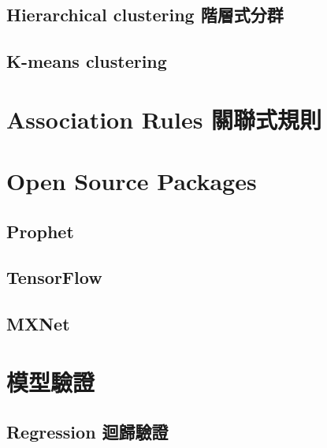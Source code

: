 \documentclass[
]{book}
\begin{document}
\hypertarget{hierarchical-clustering-ux968eux5c64ux5f0fux5206ux7fa4}{%
\subsection{Hierarchical clustering 階層式分群}\label{hierarchical-clustering-ux968eux5c64ux5f0fux5206ux7fa4}}

\hypertarget{k-means-clustering}{%
\subsection{K-means clustering}\label{k-means-clustering}}

\hypertarget{association-rules-ux95dcux806fux5f0fux898fux5247}{%
\section{Association Rules 關聯式規則}\label{association-rules-ux95dcux806fux5f0fux898fux5247}}

\hypertarget{open-source-packages}{%
\section{Open Source Packages}\label{open-source-packages}}

\hypertarget{prophet}{%
\subsection{Prophet}\label{prophet}}

\hypertarget{tensorflow}{%
\subsection{TensorFlow}\label{tensorflow}}

\hypertarget{mxnet}{%
\subsection{MXNet}\label{mxnet}}

\hypertarget{ux6a21ux578bux9a57ux8b49}{%
\section{模型驗證}\label{ux6a21ux578bux9a57ux8b49}}

\hypertarget{regression-ux8ff4ux6b78ux9a57ux8b49}{%
\subsection{Regression 迴歸驗證}\label{regression-ux8ff4ux6b78ux9a57ux8b49}}
\end{document}
